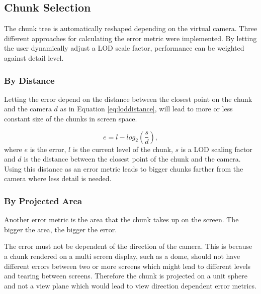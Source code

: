 \subsection{Chunk Selection}
\label{section:chunkselection}
The chunk tree is automatically reshaped depending on the virtual camera. Three different approaches for calculating the error metric were implemented. By letting the user dynamically adjust a LOD scale factor, performance can be weighted against detail level.

\subsubsection{By Distance}
Letting the error depend on the distance between the closest point on the chunk and the camera $d$ as in Equation \ref{eq:loddistance}, will lead to more or less constant size of the chunks in screen space.

\begin{equation}
	\label{eq:loddistance}
	e = l - log_2(\frac{s}{d}),
\end{equation}
where $e$ is the error, $l$ is the current level of the chunk, $s$ is a LOD scaling factor and $d$ is the distance between the closest point of the chunk and the camera. Using this distance as an error metric leads to bigger chunks farther from the camera where less detail is needed.


\subsubsection{By Projected Area}
Another error metric is the area that the chunk takes up on the screen. The bigger the area, the bigger the error. 

The error must not be dependent of the direction of the camera. This is because a chunk rendered on a multi screen display, such as a dome, should not have different errors between two or more screens which might lead to different levels and tearing between screens. Therefore the chunk is projected on a unit sphere and not a view plane which would lead to view direction dependent error metrics.

